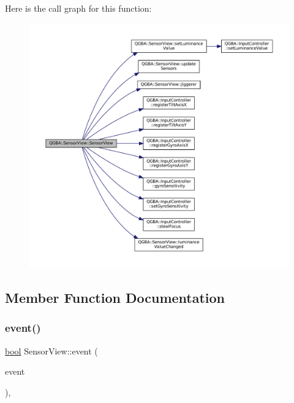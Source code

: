 Here is the call graph for this function\+:
\nopagebreak
\begin{figure}[H]
\begin{center}
\leavevmode
\includegraphics[width=350pt]{class_q_g_b_a_1_1_sensor_view_a35d0e03e33ccb200c6c20c22db1950cd_cgraph}
\end{center}
\end{figure}


\subsection{Member Function Documentation}
\mbox{\label{class_q_g_b_a_1_1_sensor_view_a058b4e2baa8ca5f86d6335bc698da284}} 
\subsubsection{\texorpdfstring{event()}{event()}}
{\footnotesize\ttfamily \mbox{\hyperlink{libretro_8h_a4a26dcae73fb7e1528214a068aca317e}{bool}} Sensor\+View\+::event (\begin{DoxyParamCaption}\item[{Q\+Event $\ast$}]{event }\end{DoxyParamCaption})\hspace{0.3cm}{\ttfamily [override]}, {\ttfamily [protected]}}

